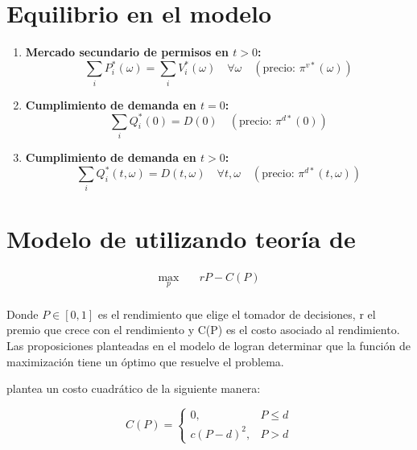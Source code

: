 \section{Equilibrio en el modelo \protect{}}

\begin{enumerate}

    \item \textbf{Mercado secundario de permisos en $t>0$:}
    \begin{equation}
    \sum_i P_i^*(\omega) = \sum_i V_i^*(\omega) \quad \forall \omega \quad (\text{precio: } \pi^{v*}(\omega))
    \end{equation}
    \item \textbf{Cumplimiento de demanda en $t=0$:}
    \begin{equation}
    \sum_i Q_i^*(0) = D(0) \quad (\text{precio: } \pi^{d*}(0))
    \end{equation}
    \item \textbf{Cumplimiento de demanda en $t>0$:}
    \begin{equation}
    \sum_i Q_i^*(t,\omega) = D(t,\omega) \quad \forall t,\omega \quad (\text{precio: } \pi^{d*}(t,\omega))
    \end{equation}
\end{enumerate}

\section{Modelo de \protect{} utilizando teoría de \protect{}}
\begin{center}
    \begin{align*}
    \max_{p} \quad & rP - C(P) \label{eq:optprecision}\\
    \end{align*}
\end{center}
    
    Donde $P \in [0,1]$ es el rendimiento que elige el tomador de decisiones, r el premio que crece con el rendimiento y C(P) es el costo asociado al rendimiento. Las proposiciones planteadas en el modelo de  logran determinar que la función de maximización tiene un óptimo que resuelve el problema.
    
     plantea un costo cuadrático de la siguiente manera:
    
    \begin{equation}
    \label{eq:costoscuadraticos}
    C(P) =
    \begin{cases}
    0, & P \leq d \\
    c(P - d)^2, & P > d
    \end{cases}
    \end{equation}




